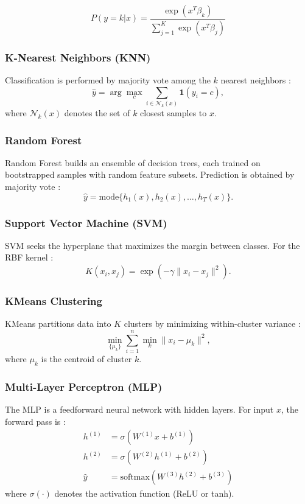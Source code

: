 \documentclass[journal]{IEEEtran}
\begin{document}
\begin{equation}
P(y=k|x) = \frac{\exp(x^T \beta_k)}{\sum_{j=1}^K \exp(x^T \beta_j)}
\end{equation}

\subsubsection{K-Nearest Neighbors (KNN)}
Classification is performed by majority vote among the $k$ nearest neighbors \cite{cover1967}:
\[
\hat{y} = \arg\max_{c} \sum_{i \in \mathcal{N}_k(x)} \mathbf{1}(y_i = c),
\]
where $\mathcal{N}_k(x)$ denotes the set of $k$ closest samples to $x$.

\subsubsection{Random Forest}
Random Forest builds an ensemble of decision trees, each trained on bootstrapped samples with random feature subsets. Prediction is obtained by majority vote \cite{breiman2001}:
\[
\hat{y} = \text{mode}\{h_1(x), h_2(x), \dots, h_T(x)\}.
\]

\subsubsection{Support Vector Machine (SVM)}
SVM seeks the hyperplane that maximizes the margin between classes. For the RBF kernel \cite{cortes1995}:
\[
K(x_i, x_j) = \exp\left(-\gamma \|x_i - x_j\|^2\right).
\]

\subsubsection{KMeans Clustering}
KMeans partitions data into $K$ clusters by minimizing within-cluster variance \cite{jain2010}:
\[
\min_{\{\mu_k\}} \sum_{i=1}^n \min_{k} \|x_i - \mu_k\|^2,
\]
where $\mu_k$ is the centroid of cluster $k$.

\subsubsection{Multi-Layer Perceptron (MLP)}
The MLP is a feedforward neural network with hidden layers. For input $x$, the forward pass is \cite{rumelhart1986}:
\begin{equation}
\begin{split}
h^{(1)} &= \sigma(W^{(1)} x + b^{(1)}) \\
h^{(2)} &= \sigma(W^{(2)} h^{(1)} + b^{(2)}) \\
\hat{y} &= \text{softmax}(W^{(3)} h^{(2)} + b^{(3)})
\end{split}
\end{equation}
where $\sigma(\cdot)$ denotes the activation function (ReLU or tanh).
\end{document}
